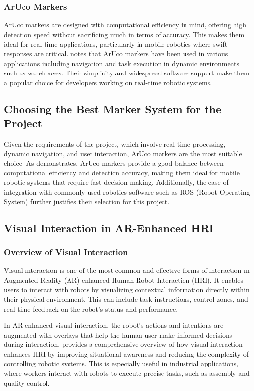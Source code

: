 \subsubsection{ArUco Markers}
ArUco markers are designed with computational efficiency in mind, offering high detection speed without sacrificing much in terms of accuracy. This makes them ideal for real-time applications, particularly in mobile robotics where swift responses are critical. \cite{Husar2022} notes that ArUco markers have been used in various applications including navigation and task execution in dynamic environments such as warehouses. Their simplicity and widespread software support make them a popular choice for developers working on real-time robotic systems.

\subsection{Choosing the Best Marker System for the Project}

Given the requirements of the project, which involve real-time processing, dynamic navigation, and user interaction, ArUco markers are the most suitable choice. As \cite{Filus2023} demonstrates, ArUco markers provide a good balance between computational efficiency and detection accuracy, making them ideal for mobile robotic systems that require fast decision-making. Additionally, the ease of integration with commonly used robotics software such as ROS (Robot Operating System) further justifies their selection for this project.

\subsection{Visual Interaction in AR-Enhanced HRI}

\subsubsection{Overview of Visual Interaction}

Visual interaction is one of the most common and effective forms of interaction in Augmented Reality (AR)-enhanced Human-Robot Interaction (HRI). It enables users to interact with robots by visualizing contextual information directly within their physical environment. This can include task instructions, control zones, and real-time feedback on the robot's status and performance.

In AR-enhanced visual interaction, the robot's actions and intentions are augmented with overlays that help the human user make informed decisions during interaction. \cite{Suzuki2022} provides a comprehensive overview of how visual interaction enhances HRI by improving situational awareness and reducing the complexity of controlling robotic systems. This is especially useful in industrial applications, where workers interact with robots to execute precise tasks, such as assembly and quality control.

